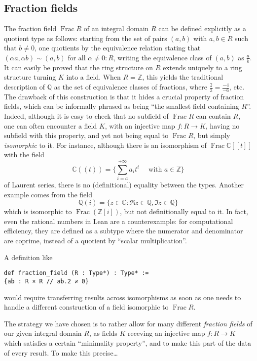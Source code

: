 \documentclass[a4paper,USenglish,cleveref, autoref, thm-restate]{lipics-v2021}
\newcommand{\C}{\mathbb{C}}
\newcommand{\Q}{\mathbb{Q}}
\newcommand{\Z}{\mathbb{Z}}
\DeclareMathOperator{\Frac}{Frac}
\begin{document}
\subsection{Fraction fields}
The fraction field $\Frac R$ of an integral domain $R$ can be defined explicitly as a quotient type as follows:
starting from the set of pairs $(a,b)$ with $a,b \in R$ such that $b\neq 0$,
one quotients by the equivalence relation stating that $(\alpha a, \alpha b) \sim (a,b)$ for all $\alpha \ne 0 : R$, writing the equivalence class of $(a,b)$ as $\frac{a}{b}$.
It can easily be proved that the ring structure on $R$ extends uniquely to a ring structure turning $K$ into a field.
When $R=\Z$, this yields the traditional description of $\Q$ as the set of equivalence classes of fractions, where $\frac{2}{3}=\frac{-4}{-6}$, etc.
The drawback of this construction is that it hides a crucial property of fraction fields, which can be informally phrased as being ``the smallest field containing $R$''.
Indeed, although it is easy to check that no subfield of $\Frac R$ can contain $R$, one can often encounter a field $K$, with an injective map $f\colon R\to K$, having no subfield with this property, and yet not being equal to $\Frac R$, but simply \emph{isomorphic} to it. For instance, although there is an isomorphism of $\Frac \C[\![t]\!]$ with the field
\[
\C(\!(t)\!)=\big\{\sum_{i=a}^{+\infty} a_it^i\quad\text{ with }a \in \Z\big\}
\]
of Laurent series, there is no (definitional) equality between the types. Another example comes from the field
\[
\Q(i)=\{z \in \C : \Re z \in \Q, \Im z\in\Q\}
\]
which is isomorphic to $\Frac (\Z[i])$, but not definitionally equal to it.
In fact, even the rational numbers in Lean are a counterexample:
for computational efficiency, they are defined as a subtype where the numerator and denominator are coprime,
instead of a quotient by ``scalar multiplication''.

A definition like
\begin{lstlisting}
def fraction_field (R : Type*) : Type* :=
{ab : R × R // ab.2 ≠ 0}
\end{lstlisting}
would require transferring results across isomorphisms as soon as one needs to handle a different construction of a field isomorphic to $\Frac R$.

The strategy we have chosen is to rather allow for many different \emph{fraction fields} of our given integral domain $R$, as fields $K$ receving an injective map $f\colon R\to K$ which satisfies a certain ``minimality property'', and to make this part of the data of every result. To make this precise\dots
\end{document}
